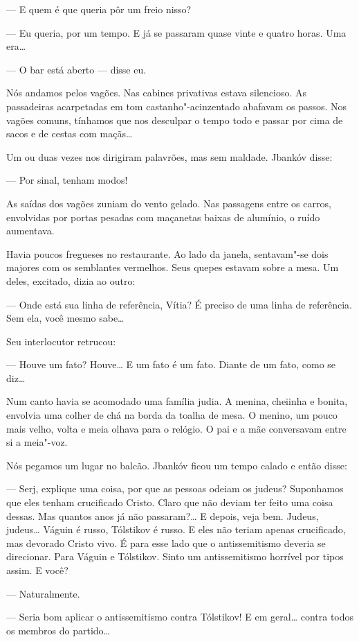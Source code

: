 --- E quem é que queria pôr um freio nisso?

--- Eu queria, por um tempo. E já se passaram quase vinte e
quatro horas. Uma era\ldots{}

--- O bar está aberto --- disse eu.

Nós andamos pelos vagões. Nas cabines privativas estava silencioso. As
passadeiras acarpetadas em tom castanho"-acinzentado abafavam os passos.
Nos vagões comuns, tínhamos que nos desculpar o tempo todo e passar por
cima de sacos e de cestas com maçãs\ldots{}

Um ou duas vezes nos dirigiram palavrões, mas sem maldade. Jbankóv
disse:

--- Por sinal, tenham modos!

As saídas dos vagões zuniam do vento gelado. Nas passagens entre os
carros, envolvidas por portas pesadas com maçanetas baixas de alumínio,
o ruído aumentava.

Havia poucos fregueses no restaurante. Ao lado da janela, sentavam"-se
dois majores com os semblantes vermelhos. Seus quepes estavam sobre a
mesa. Um deles, excitado, dizia ao outro:

--- Onde está sua linha de referência, Vítia? É preciso de uma
linha de referência. Sem ela, você mesmo sabe\ldots{}

Seu interlocutor retrucou:

--- Houve um fato? Houve\ldots{} E um fato é um fato. Diante de um
fato, como se diz\ldots{}

Num canto havia se acomodado uma família judia. A menina, cheiinha e
bonita, envolvia uma colher de chá na borda da toalha de mesa. O menino,
um pouco mais velho, volta e meia olhava para o relógio. O pai e a mãe
conversavam entre si a meia"-voz.

Nós pegamos um lugar no balcão. Jbankóv ficou um tempo calado e então
disse:

--- Serj, explique uma coisa, por que as pessoas odeiam os
judeus? Suponhamos que eles tenham crucificado Cristo. Claro que não
deviam ter feito uma coisa dessas. Mas quantos anos já não passaram?\ldots{}
E depois, veja bem. Judeus, judeus\ldots{} Váguin é russo, Tólstikov é russo.
E eles não teriam apenas crucificado, mas devorado Cristo vivo. É para
esse lado que o antissemitismo deveria se direcionar. Para Váguin e
Tólstikov. Sinto um antissemitismo horrível por tipos assim. E você?

--- Naturalmente.

--- Seria bom aplicar o antissemitismo contra Tólstikov! E em
geral\ldots{} contra todos os membros do partido\ldots{}

